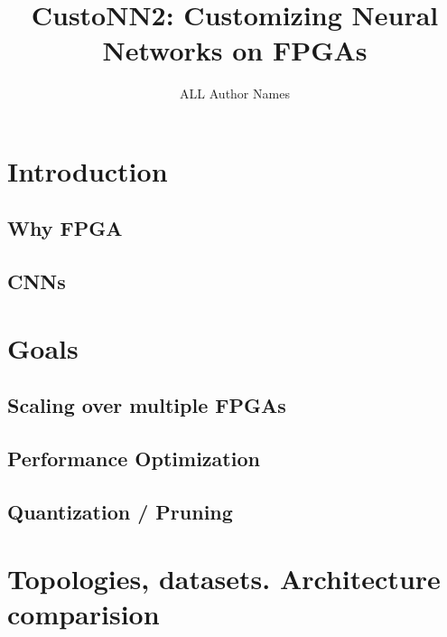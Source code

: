 \documentclass[titlepage]{report}
\author{ALL Author Names}
\title{\textbf{CustoNN2: Customizing Neural Networks on FPGAs}}
\begin{document}
\maketitle

\tableofcontents
\newpage

\chapter{Introduction}


\section{Why FPGA}

\lipsum[3]

\section{CNNs}

\lipsum[3]



\chapter{Goals}

\section{Scaling over multiple FPGAs}

\lipsum[3]

\section{Performance Optimization}
\lipsum[3]

\section{Quantization / Pruning}
\lipsum[3]



\chapter{Topologies, datasets. Architecture comparision}
\end{document}
